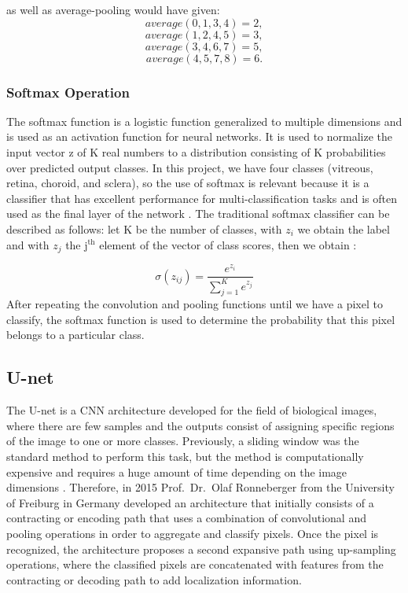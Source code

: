 \documentclass[12pt,a4paper]{scrartcl}
\begin{document}
as well as average-pooling would have given:
\[average (0, 1, 3, 4) = 2,\]
\[average (1, 2, 4, 5) = 3,\]
\[average (3, 4, 6, 7) = 5,\]
\[average (4, 5, 7, 8) = 6.\]

\subsubsection{Softmax Operation}\label{tech:softmax}
The softmax function is a logistic function generalized to multiple dimensions and is used as an activation function for neural networks. It is used to normalize the input vector z of K real numbers to a distribution consisting of K probabilities over predicted output classes. In this project, we have four classes (vitreous, retina, choroid, and sclera), so the use of softmax is relevant because it is a classifier that has excellent performance for multi-classification tasks and is often used as the final layer of the network \cite{SoftMaxClassification}. 
The traditional softmax classifier can be described as follows: let K be the number of classes, with \(z_i\) we obtain the label and with \(z_j\) the j$^\mathrm{th}$ element of the vector of class scores, then we obtain \cite{SoftMaxClassification, DIDLBook}:

\begin{equation}
\sigma(z_{ij}) = \frac{e^{z_i}}{\sum_{j=1}^{K} e^{z_j}}
\end{equation}
After repeating the convolution and pooling functions until we have a pixel to classify,  the softmax function is used to determine the probability that this pixel belongs to a particular class.

\subsection{U-net}\label{tech:unet}

The U-net is a CNN architecture developed for the field of biological images,  where there are few samples and the outputs consist of assigning specific regions of the image to one or more classes. Previously, a sliding window was the standard method to perform this task, but the method is computationally expensive and requires a huge amount of time depending on the image dimensions \cite{Ronneberger2015}. Therefore, in 2015 Prof.~Dr.~Olaf Ronneberger from the University of Freiburg in Germany developed an architecture that initially consists of a contracting or encoding path that uses a combination of convolutional and pooling operations in order to aggregate and classify pixels. Once the pixel is recognized, the architecture proposes a second expansive path using up-sampling operations, where the classified pixels are concatenated with features from the contracting or decoding path to add localization information. 
\end{document}
